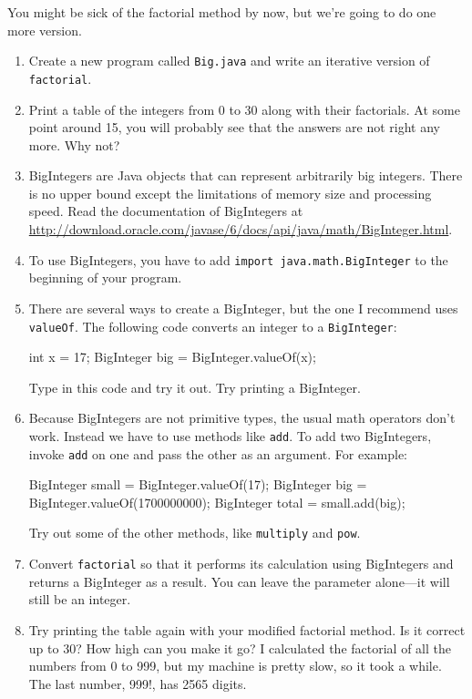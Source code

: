 \begin{exercise}
\label{ex.biginteger}
You might be sick of the factorial
method by now, but we're going to do one more version.

\begin{enumerate}

\item Create a new program called {\tt Big.java} and
write an iterative version of {\tt factorial}.

\item Print a table of the integers from 0 to 30 along with their
factorials.  At some point around 15, you will probably see
that the answers are not right any more.  Why not?

\item BigIntegers are Java objects that can represent arbitrarily big
  integers.  There is no upper bound except the limitations of memory
  size and processing speed.  Read the documentation of BigIntegers at
  \url{http://download.oracle.com/javase/6/docs/api/java/math/BigInteger.html}.

\item To use BigIntegers, you have to add {\tt import
java.math.BigInteger} to the beginning of your program.

\item There are several ways to create a
BigInteger, but the one I recommend uses {\tt valueOf}.
The following code converts an integer to a {\tt BigInteger}:

\begin{code}
    int x = 17;
    BigInteger big = BigInteger.valueOf(x);
\end{code}

Type in this code and try it out.  Try printing a BigInteger.

\item Because BigIntegers are not primitive types,
the usual math operators don't work.  Instead we
have to use methods like {\tt add}.  To
add two BigIntegers, invoke {\tt add} on one
and pass the other as an argument.  For example:

\begin{code}
    BigInteger small = BigInteger.valueOf(17);
    BigInteger big = BigInteger.valueOf(1700000000);
    BigInteger total = small.add(big);
\end{code}

Try out some of the other methods, like {\tt multiply} and
{\tt pow}.

\item Convert {\tt factorial} so that it performs its calculation
using BigIntegers and returns a BigInteger as a result.
You can leave the parameter alone---it will still be an integer.

\item Try printing the table again with your modified factorial
method.  Is it correct up to 30?  How high can you make it go?  I
calculated the factorial of all the numbers from 0 to 999, but my
machine is pretty slow, so it took a while.  The last number, 999!,
has 2565 digits.

\end{enumerate}
\end{exercise}

